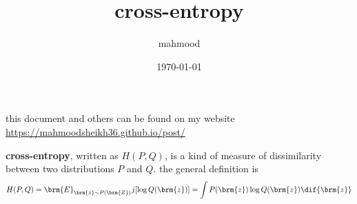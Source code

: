 \documentclass[a4paper,12pt]{article}
\author{mahmood}
\date{\today}
\title{cross-entropy}
\begin{document}
\maketitle
\begin{note}
this document and others can be found on my website\\
\url{https://mahmoodsheikh36.github.io/post/}
\end{note}
\textbf{cross-entropy}, written as \(H(P,Q)\), is a kind of measure of dissimilarity between two distributions \(P\) and \(Q\). the general definition is\\
\[
H(P,Q) = \brm{E}_{\brm{z} \sim P(\brm{Z})}j[\log Q(\brm{z})] = \int P(\brm{z})\log Q(\brm{z}) \dif{\brm{z}}
\]
\end{document}
